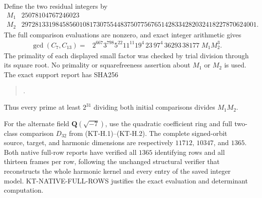 Define the two residual integers by
\[
\begin{array}{c|r}
 M_1&25078104767246023\\
 M_2&297281331984585601081730755448375077567651428334282032418227870624001.
\end{array}                                                   \tag{KN.2}
\]
The full comparison evaluations are nonzero, and exact integer
arithmetic gives
\[
\begin{split}
 \gcd(C_7,C_{13})={}&
 2^{667}3^{798}5^{22}11^{11}19^4\,23\,97^4\,36293\,38177
                         \;M_1M_2^3.
\end{split}                                                 \tag{KN.3}
\]
The primality of each displayed small factor was checked by
trial division through its square root.  No primality or
squarefreeness assertion about $M_1$ or $M_2$ is used.
The exact support report has SHA256
\begin{quote}\small
{}.
\end{quote}
Thus every prime at least $2^{31}$ dividing both initial
comparisons divides $M_1M_2$.

For the alternate field $\mathbf Q(\sqrt{-7})$, use the
quadratic coefficient ring and full two-class comparison
$D_{32}$ from (KT-H.1)--(KT-H.2).  The complete signed-orbit
source, target, and harmonic dimensions are respectively
$11712$, $10347$, and $1365$.  Both native full-row reports
have verified all $1365$ identifying rows and all thirteen
frames per row, following the unchanged structural verifier
that reconstructs the whole harmonic kernel and every entry
of the saved integer model.  KT-NATIVE-FULL-ROWS justifies
the exact evaluation and determinant computation.

